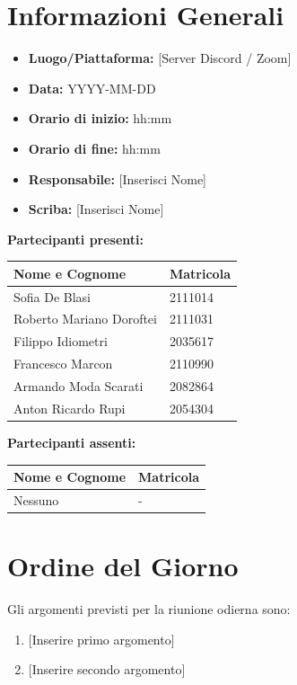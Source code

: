 \section{Informazioni Generali}
\begin{itemize}
	\item \textbf{Luogo/Piattaforma:} {[Server Discord / Zoom]}
	\item \textbf{Data:} YYYY-MM-DD
	\item \textbf{Orario di inizio:} hh:mm
	\item \textbf{Orario di fine:} hh:mm
	\item \textbf{Responsabile:} {[Inserisci Nome]}
	\item \textbf{Scriba:} {[Inserisci Nome]}
\end{itemize}

\vspace{0.5cm}
\textbf{Partecipanti presenti:}
\begin{table}[ht]
	\centering
	\renewcommand{\arraystretch}{1.2}
	\begin{tabularx}{\textwidth}{X l}
		\toprule
		\textbf{Nome e Cognome} & \textbf{Matricola} \\
		\midrule
		Sofia De Blasi & 2111014 \\
		Roberto Mariano Doroftei & 2111031 \\
		Filippo Idiometri & 2035617 \\
		Francesco Marcon & 2110990 \\
		Armando Moda Scarati & 2082864 \\
		Anton Ricardo Rupi & 2054304 \\
		\bottomrule
	\end{tabularx}
\end{table}

\vspace{0.5cm}
\textbf{Partecipanti assenti:}
\begin{table}[ht]
	\centering
	\renewcommand{\arraystretch}{1.2}
	\begin{tabularx}{\textwidth}{X l}
		\toprule
		\textbf{Nome e Cognome} & \textbf{Matricola} \\
		\midrule
		Nessuno & - \\
		\bottomrule
	\end{tabularx}
\end{table}

\section{Ordine del Giorno}
Gli argomenti previsti per la riunione odierna sono:
\begin{enumerate}
	\item {[Inserire primo argomento]}
	\item {[Inserire secondo argomento]}
\end{enumerate}

